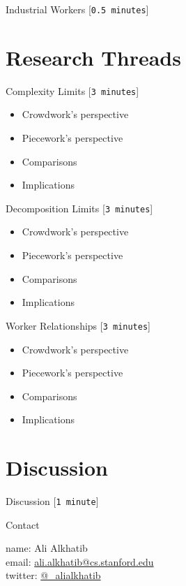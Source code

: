 \documentclass{beamer}
\begin{document}
\begin{frame}{Industrial Workers
                                                                                [\texttt{0.5 minutes}]
}
\end{frame}



\section{Research Threads}
\begin{frame}{Complexity Limits
                                                                                [\texttt{3 minutes}]
}
\begin{itemize}[<+- | alert@+>]
  \item Crowdwork's perspective
  \item Piecework's perspective
  \item Comparisons
  \item Implications
\end{itemize}
\end{frame}

\begin{frame}{Decomposition Limits
                                                                                [\texttt{3 minutes}]
}
\begin{itemize}[<+- | alert@+>]
  \item Crowdwork's perspective
  \item Piecework's perspective
  \item Comparisons
  \item Implications
\end{itemize}
\end{frame}

\begin{frame}{Worker Relationships
                                                                                [\texttt{3 minutes}]
}
\begin{itemize}[<+- | alert@+>]
  \item Crowdwork's perspective
  \item Piecework's perspective
  \item Comparisons
  \item Implications
\end{itemize}
\end{frame}

\section{Discussion}
\begin{frame}{Discussion
                                                                                [\texttt{1 minute}]
}
\end{frame}



\begin{frame}{Contact}

    name: {Ali Alkhatib} \\
    email: \href{mailto:ali.alkhatib@cs.stanford.edu}{ali.alkhatib@cs.stanford.edu} \\
    twitter: \href{https://twitter.com/_alialkhatib}{@\_alialkhatib} \\
\end{frame}


% 
\printbibliography{}
\end{document}
